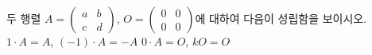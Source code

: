 \hspace*{2mm}\begin{minipage}[t]{\dimexpr\linewidth-2mm\relax}\vspace{0pt}
두 행렬 $A=\begin{pmatrix} a & b \\ c & d \end{pmatrix}$, $O=\begin{pmatrix} 0 & 0 \\ 0 & 0 \end{pmatrix}$에 대하여 다음이 성립함을 보이시오. 
 $1\cdot A=A$, $(-1)\cdot A=-A$
 $0\cdot A=O$, $kO=O$\end{minipage}
